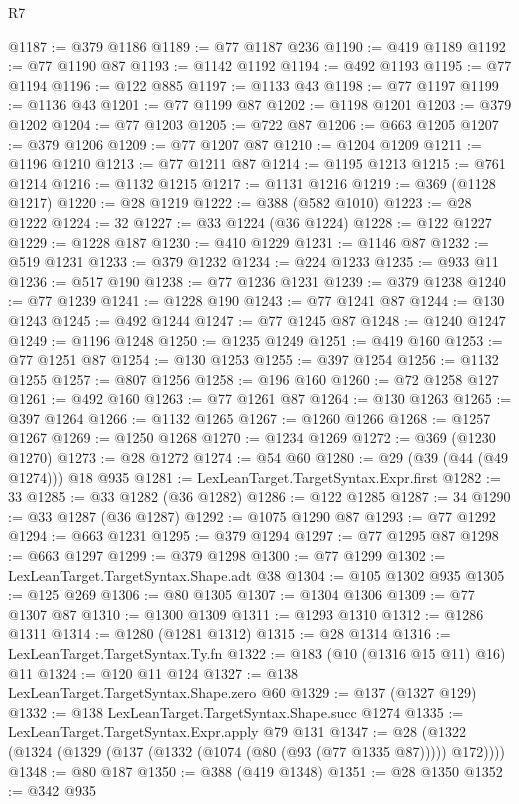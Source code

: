 \begin{lexlean}{R7}
\begin{coremodule}
@1187 := @379 @1186
@1189 := @77 @1187 @236
@1190 := @419 @1189
@1192 := @77 @1190 @87
@1193 := @1142 @1192
@1194 := @492 @1193
@1195 := @77 @1194
@1196 := @122 @885
@1197 := @1133 @43
@1198 := @77 @1197
@1199 := @1136 @43
@1201 := @77 @1199 @87
@1202 := @1198 @1201
@1203 := @379 @1202
@1204 := @77 @1203
@1205 := @722 @87
@1206 := @663 @1205
@1207 := @379 @1206
@1209 := @77 @1207 @87
@1210 := @1204 @1209
@1211 := @1196 @1210
@1213 := @77 @1211 @87
@1214 := @1195 @1213
@1215 := @761 @1214
@1216 := @1132 @1215
@1217 := @1131 @1216
@1219 := @369 (@1128 @1217)
@1220 := @28 @1219
@1222 := @388 (@582 @1010)
@1223 := @28 @1222
@1224 := 32
@1227 := @33 @1224 (@36 @1224)
@1228 := @122 @1227
@1229 := @1228 @187
@1230 := @410 @1229
@1231 := @1146 @87
@1232 := @519 @1231
@1233 := @379 @1232
@1234 := @224 @1233
@1235 := @933 @11
@1236 := @517 @190
@1238 := @77 @1236 @1231
@1239 := @379 @1238
@1240 := @77 @1239
@1241 := @1228 @190
@1243 := @77 @1241 @87
@1244 := @130 @1243
@1245 := @492 @1244
@1247 := @77 @1245 @87
@1248 := @1240 @1247
@1249 := @1196 @1248
@1250 := @1235 @1249
@1251 := @419 @160
@1253 := @77 @1251 @87
@1254 := @130 @1253
@1255 := @397 @1254
@1256 := @1132 @1255
@1257 := @807 @1256
@1258 := @196 @160
@1260 := @72 @1258 @127
@1261 := @492 @160
@1263 := @77 @1261 @87
@1264 := @130 @1263
@1265 := @397 @1264
@1266 := @1132 @1265
@1267 := @1260 @1266
@1268 := @1257 @1267
@1269 := @1250 @1268
@1270 := @1234 @1269
@1272 := @369 (@1230 @1270)
@1273 := @28 @1272
@1274 := @54 @60
@1280 := @29 (@39 (@44 (@49 @1274))) @18 @935
@1281 := LexLeanTarget.TargetSyntax.Expr.first
@1282 := 33
@1285 := @33 @1282 (@36 @1282)
@1286 := @122 @1285
@1287 := 34
@1290 := @33 @1287 (@36 @1287)
@1292 := @1075 @1290 @87
@1293 := @77 @1292
@1294 := @663 @1231
@1295 := @379 @1294
@1297 := @77 @1295 @87
@1298 := @663 @1297
@1299 := @379 @1298
@1300 := @77 @1299
@1302 := LexLeanTarget.TargetSyntax.Shape.adt @38
@1304 := @105 @1302 @935
@1305 := @125 @269
@1306 := @80 @1305
@1307 := @1304 @1306
@1309 := @77 @1307 @87
@1310 := @1300 @1309
@1311 := @1293 @1310
@1312 := @1286 @1311
@1314 := @1280 (@1281 @1312)
@1315 := @28 @1314
@1316 := LexLeanTarget.TargetSyntax.Ty.fn
@1322 := @183 (@10 (@1316 @15 @11) @16) @11
@1324 := @120 @11 @124
@1327 := @138 LexLeanTarget.TargetSyntax.Shape.zero @60
@1329 := @137 (@1327 @129)
@1332 := @138 LexLeanTarget.TargetSyntax.Shape.succ @1274
@1335 := LexLeanTarget.TargetSyntax.Expr.apply @79 @131
@1347 := @28 (@1322 (@1324 (@1329 (@137 (@1332 (@1074 (@80 (@93 (@77 @1335 @87))))) @172))))
@1348 := @80 @187
@1350 := @388 (@419 @1348)
@1351 := @28 @1350
@1352 := @342 @935

\end{coremodule}
\end{lexlean}
